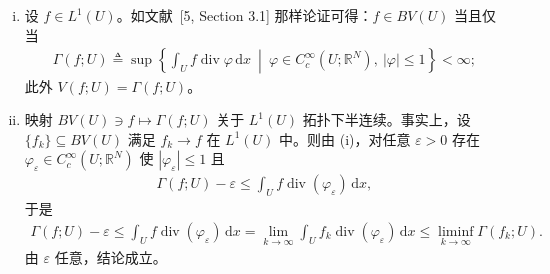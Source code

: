 \documentclass[../../main.tex]{subfiles}%
\begin{document}
\begin{remark}\label{remark:ch03-BV等价}\label{remark:ch03-3.1.4}
\begin{enumerate}[(i)]
\item 设 $f\in L^1(U)$。如文献~[5, Section 3.1] 那样论证可得：$f\in BV(U)$ 当且仅当
\begin{align*}
\Gamma(f;U)\triangleq \sup\left\{\int_U f\operatorname{div}\varphi\,\mathrm{d}x\ \middle|\ \varphi\in C^\infty_c(U;\mathbb{R}^N),\ |\varphi|\leqslant1\right\}<\infty;
\end{align*}
此外 $V(f;U)=\Gamma(f;U)$。
\item 映射 $BV(U)\ni f\mapsto\Gamma(f;U)$ 关于 $L^1(U)$ 拓扑下半连续。事实上，设 $\{f_k\}\subseteq BV(U)$ 满足 $f_k\to f$ 在 $L^1(U)$ 中。则由 (i)，对任意 $\varepsilon>0$ 存在 $\varphi_\varepsilon\in C^\infty_c(U;\mathbb{R}^N)$ 使 $|\varphi_\varepsilon|\leqslant1$ 且
\begin{align*}
\Gamma(f;U)-\varepsilon\leqslant\int_Uf\operatorname{div}(\varphi_\varepsilon)\,\mathrm{d}x,
\end{align*}
于是
\begin{align*}
\Gamma(f;U)-\varepsilon\leqslant\int_Uf\operatorname{div}(\varphi_\varepsilon)\,\mathrm{d}x=\lim_{k\to\infty}\int_Uf_k\operatorname{div}(\varphi_\varepsilon)\,\mathrm{d}x\leqslant\liminf_{k\to\infty}\Gamma(f_k;U).
\end{align*}
由 $\varepsilon$ 任意，结论成立。
\end{enumerate}
\end{remark}
\end{document}

